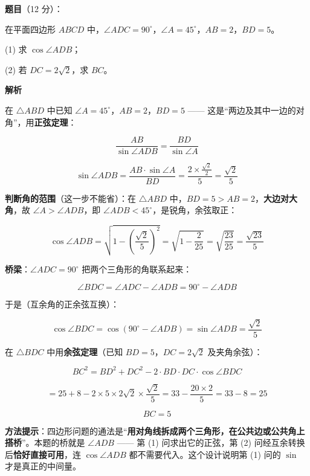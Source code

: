 \begin{answer}

\textbf{题目}（12 分）：

在平面四边形 $ABCD$ 中，$\angle ADC=90^\circ$，$\angle A=45^\circ$，$AB=2$，$BD=5$。

  (1) 求 $\cos\angle ADB$；

  (2) 若 $DC=2\sqrt2$，求 $BC$。

\textbf{解析}


在 $\triangle ABD$ 中已知 $\angle A=45^\circ$，$AB=2$，$BD=5$ —— 这是“两边及其中一边的对角”，用\textbf{正弦定理}：

\nopagebreak[4]
\[\frac{AB}{\sin\angle ADB}=\frac{BD}{\sin\angle A}\]

\nopagebreak[4]
\[\sin\angle ADB=\frac{AB\cdot\sin\angle A}{BD}=\frac{2\times\frac{\sqrt2}2}5=\frac{\sqrt2}5\]

\textbf{判断角的范围}（这一步不能省）：在 $\triangle ABD$ 中，$BD=5>AB=2$，\textbf{大边对大角}，故 $\angle A>\angle ADB$，即 $\angle ADB<45^\circ$，是锐角，余弦取正：

\nopagebreak[4]
\[\cos\angle ADB=\sqrt{1-\left(\frac{\sqrt2}5\right)^{2}}=\sqrt{1-\frac2{25}}=\sqrt{\frac{23}{25}}=\frac{\sqrt{23}}5\]


\textbf{桥梁}：$\angle ADC=90^\circ$ 把两个三角形的角联系起来：

\nopagebreak[4]
\[\angle BDC=\angle ADC-\angle ADB=90^\circ-\angle ADB\]

于是（互余角的正余弦互换）：

\nopagebreak[4]
\[\cos\angle BDC=\cos\left(90^\circ-\angle ADB\right)=\sin\angle ADB=\frac{\sqrt2}5\]

在 $\triangle BDC$ 中用\textbf{余弦定理}（已知 $BD=5$，$DC=2\sqrt2$ 及夹角余弦）：

\nopagebreak[4]
\[BC^{2}=BD^{2}+DC^{2}-2\cdot BD\cdot DC\cdot\cos\angle BDC\]

\nopagebreak[4]
\[=25+8-2\times5\times2\sqrt2\times\frac{\sqrt2}5=33-\frac{20\times2}5=33-8=25\]

\nopagebreak[4]
\[BC=5\]

\begin{gktip}
\textbf{方法提示}：四边形问题的通法是“\textbf{用对角线拆成两个三角形，在公共边或公共角上搭桥}”。本题的桥就是 $\angle ADB$ —— 第 (1) 问求出它的正弦，第 (2) 问经互余转换后\textbf{恰好直接可用}，连 $\cos\angle ADB$ 都不需要代入。这个设计说明第 (1) 问的 $\sin$ 才是真正的中间量。
\end{gktip}



\par\medskip

\end{answer}

